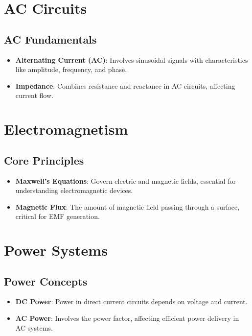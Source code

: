 \documentclass[12pt]{article}
\newcommand{\concept}[1]{\textbf{#1}}
\begin{document}
\section{AC Circuits}
\subsection{AC Fundamentals}
\begin{itemize}
    \item \concept{Alternating Current (AC)}: Involves sinusoidal signals with characteristics like amplitude, frequency, and phase.
    \item \concept{Impedance}: Combines resistance and reactance in AC circuits, affecting current flow.
\end{itemize}

\section{Electromagnetism}
\subsection{Core Principles}
\begin{itemize}
    \item \concept{Maxwell's Equations}: Govern electric and magnetic fields, essential for understanding electromagnetic devices.
    \item \concept{Magnetic Flux}: The amount of magnetic field passing through a surface, critical for EMF generation.
\end{itemize}

\section{Power Systems}
\subsection{Power Concepts}
\begin{itemize}
    \item \concept{DC Power}: Power in direct current circuits depends on voltage and current.
    \item \concept{AC Power}: Involves the power factor, affecting efficient power delivery in AC systems.
\end{itemize}
\end{document}
